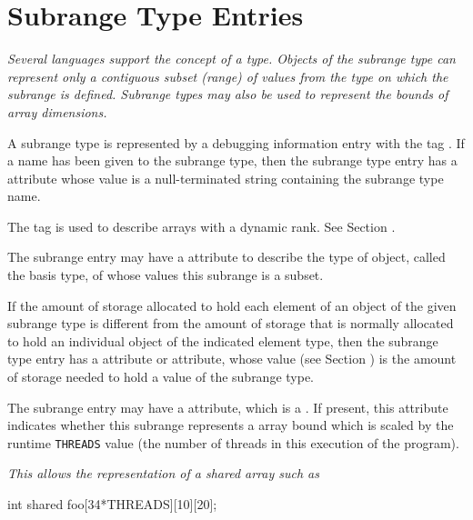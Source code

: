\section{Subrange Type Entries}
\label{chap:subrangetypeentries}

\textit{Several languages support the concept of a 
type. Objects of the subrange type can represent only a contiguous
subset (range) of values from the type on which the subrange is defined.
Subrange types may also be used to represent the bounds of array dimensions.}

A subrange type is represented by a debugging information
entry with the tag
\DWTAGsubrangetypeTARG.
If a name has been given to the subrange type, then the
subrange type entry has a
\DWATname{} attribute
whose value is a null-terminated
string containing the subrange type name.

The tag \DWTAGgenericsubrange{}
is used to describe arrays with a dynamic rank. See Section
.

The subrange entry may have a
\DWATtype{} attribute to describe
the type of object, called the basis type, of whose values
this subrange is a subset.

If the amount of storage allocated to hold each element of an
object of the given subrange type is different from the amount
of storage that is normally allocated to hold an individual
object of the indicated element type, then the subrange
type entry has a
\DWATbytesize{} attribute or
\DWATbitsize{}
attribute, whose value
(see Section )
is the amount of storage needed to hold a value of the subrange type.

The\hypertarget{chap:DWATthreadsscaledupcarrayboundthreadsscalfactor}{}
subrange entry may have a
\DWATthreadsscaledDEFN{} attribute,
which is a .
If present, this attribute indicates whether
this subrange represents a  array bound which is scaled
by the runtime \texttt{THREADS} value (the number of  threads in
this execution of the program).

\textit{This allows the representation of a  shared array such as}

\begin{nlnlisting}
int shared foo[34*THREADS][10][20];
\end{nlnlisting}

